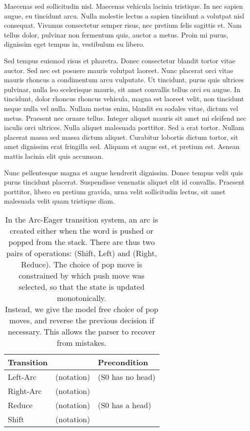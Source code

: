 \documentclass[11pt,letterpaper]{article}
\begin{document}
Maecenas sed sollicitudin nisl. Maecenas vehicula lacinia tristique. In nec sapien augue, eu tincidunt arcu. Nulla molestie lectus a sapien tincidunt a volutpat nisl consequat. Vivamus consectetur semper risus, nec pretium felis sagittis et. Nam tellus dolor, pulvinar non fermentum quis, auctor a metus. Proin mi purus, dignissim eget tempus in, vestibulum eu libero.

Sed tempus euismod risus et pharetra. Donec consectetur blandit tortor vitae auctor. Sed nec est posuere mauris volutpat laoreet. Nunc placerat orci vitae mauris rhoncus a condimentum arcu vulputate. Ut tincidunt, purus quis ultrices pulvinar, nulla leo scelerisque mauris, sit amet convallis tellus orci eu augue. In tincidunt, dolor rhoncus rhoncus vehicula, magna est laoreet velit, non tincidunt neque nulla vel nulla. Nullam metus enim, blandit eu sodales vitae, dictum vel metus. Praesent nec ornare tellus. Integer aliquet mauris sit amet mi eleifend nec iaculis orci ultrices. Nulla aliquet malesuada porttitor. Sed a erat tortor. Nullam placerat massa sed massa dictum aliquet. Curabitur lobortis dictum tortor, sit amet dignissim erat fringilla sed. Aliquam et augue est, et pretium est. Aenean mattis lacinia elit quis accumsan.

Nunc pellentesque magna et augue hendrerit dignissim. Donec tempus velit quis purus tincidunt placerat. Suspendisse venenatis aliquet elit id convallis. Praesent porttitor, libero eu pretium gravida, urna velit sollicitudin lectus, sit amet malesuada velit quam tristique diam.

\begin{table*}[ht]
\centering
    \begin{tabular}{ll|l}
Transition & & Precondition \\
\hline \hline
Left-Arc   & (notation) & (S0 has no head) \\ 
Right-Arc  & (notation) &   \\
Reduce     & (notation) & (S0 has a head) \\  
Shift      & (notation) & \\
\end{tabular}
\caption{In the Arc-Eager transition system, an arc is created either when the word is
    pushed or popped from the stack. There are thus two pairs of operations: (Shift, Left)
    and (Right, Reduce). The choice of pop move is constrained by which push move
    was selected, so that the state is updated monotonically.\\
Instead, we give the model free choice of pop moves, and reverse the previous
decision if necessary. This allows the parser to recover from mistakes.}
\label{tab:transitions}
\end{table*}
\end{document}
